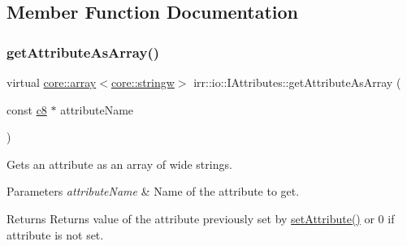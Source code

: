 \subsection{Member Function Documentation}
\mbox{\label{classirr_1_1io_1_1IAttributes_af4fb7e071a70bc0e9c57099bc04eda4f}} 
\subsubsection{\texorpdfstring{get\+Attribute\+As\+Array()}{getAttributeAsArray()}\hspace{0.1cm}{\footnotesize\ttfamily [1/2]}}
{\footnotesize\ttfamily virtual \hyperlink{classirr_1_1core_1_1array}{core\+::array}$<$\hyperlink{namespaceirr_1_1core_aef83fafbb1b36fcce44c07c9be23a7f2}{core\+::stringw}$>$ irr\+::io\+::\+I\+Attributes\+::get\+Attribute\+As\+Array (\begin{DoxyParamCaption}\item[{const \hyperlink{namespaceirr_a9395eaea339bcb546b319e9c96bf7410}{c8} $\ast$}]{attribute\+Name }\end{DoxyParamCaption})\hspace{0.3cm}{\ttfamily [pure virtual]}}



Gets an attribute as an array of wide strings. 


\begin{DoxyParams}{Parameters}
{\em attribute\+Name} & Name of the attribute to get. \\
\hline
\end{DoxyParams}
\begin{DoxyReturn}{Returns}
Returns value of the attribute previously set by \hyperlink{classirr_1_1io_1_1IAttributes_a03fa31acb481ae23678676cc183f09a6}{set\+Attribute()} or 0 if attribute is not set. 
\end{DoxyReturn}
\mbox{\label{classirr_1_1io_1_1IAttributes_a78e6562bd6e45c24d10c8cf77e3b317a}} 

